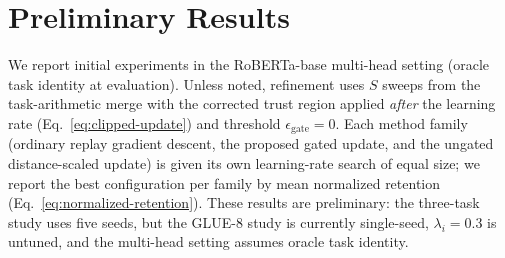 \documentclass[11pt]{article}
\begin{document}

\section{Preliminary Results}
\label{sec:results}
We report initial experiments in the RoBERTa-base multi-head setting (oracle task identity at evaluation). Unless noted, refinement uses $S$ sweeps from the task-arithmetic merge with the corrected trust region applied \emph{after} the learning rate (Eq.~\eqref{eq:clipped-update}) and threshold $\epsilon_{\mathrm{gate}}=0$. Each method family (ordinary replay gradient descent, the proposed gated update, and the ungated distance-scaled update) is given its own learning-rate search of equal size; we report the best configuration per family by mean normalized retention (Eq.~\eqref{eq:normalized-retention}). These results are preliminary: the three-task study uses five seeds, but the GLUE-8 study is currently single-seed, $\lambda_i=0.3$ is untuned, and the multi-head setting assumes oracle task identity.
\end{document}
